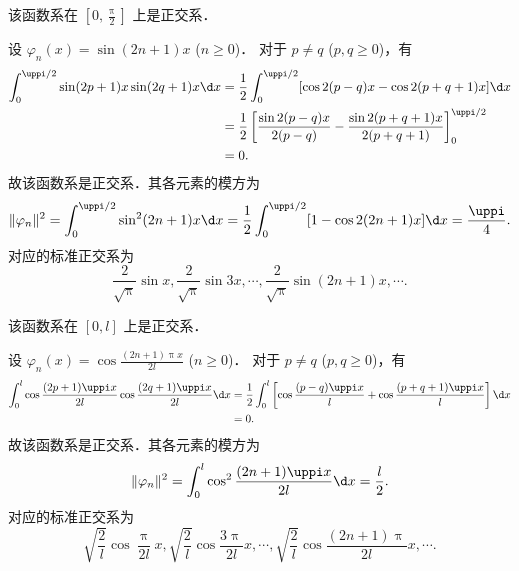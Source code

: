 \begin{myproof}
    该函数系在 $[0, \frac{\uppi}{2}]$ 上是正交系．

    设 $\varphi_n(x) = \sin(2n+1)x$ ($n \geqslant 0$)．
    对于 $p \neq q$ ($p, q \geqslant 0$)，有
    \begin{equation}\label{eq:orth-3-1}
        \begin{aligned}
            \int_{0}^{\uppi/2} \sin(2p+1)x \sin(2q+1)x \d x & = \frac{1}{2} \int_{0}^{\uppi/2} [\cos 2(p-q)x - \cos 2(p+q+1)x] \d x                                    \\
                                                            & = \frac{1}{2} \left[ \frac{\sin 2(p-q)x}{2(p-q)} - \frac{\sin 2(p+q+1)x}{2(p+q+1)} \right]_{0}^{\uppi/2} \\
                                                            & = 0.
        \end{aligned}
    \end{equation}
    故该函数系是正交系．其各元素的模方为
    \begin{equation}\label{eq:norm-3}
        \|\varphi_n\|^2 = \int_{0}^{\uppi/2} \sin^2(2n+1)x \d x = \frac{1}{2} \int_{0}^{\uppi/2} [1 - \cos 2(2n+1)x] \d x = \frac{\uppi}{4}.
    \end{equation}
    对应的标准正交系为
    \begin{equation}
        \boxed{\frac{2}{\sqrt{\uppi}}\sin x, \frac{2}{\sqrt{\uppi}}\sin 3x, \cdots, \frac{2}{\sqrt{\uppi}}\sin(2n+1)x, \cdots}.
    \end{equation}

    该函数系在 $[0, l]$ 上是正交系．

    设 $\varphi_n(x) = \cos \frac{(2n+1)\uppi x}{2l}$ ($n \geqslant 0$)．
    对于 $p \neq q$ ($p, q \geqslant 0$)，有
    \begin{equation}\label{eq:orth-4-1}
        \begin{aligned}
            \int_{0}^{l} \cos \frac{(2p+1)\uppi x}{2l} \cos \frac{(2q+1)\uppi x}{2l} \d x & = \frac{1}{2} \int_{0}^{l} \left[ \cos \frac{(p-q)\uppi x}{l} + \cos \frac{(p+q+1)\uppi x}{l} \right] \d x \\
                                                                                          & = 0.
        \end{aligned}
    \end{equation}
    故该函数系是正交系．其各元素的模方为
    \begin{equation}\label{eq:norm-4}
        \|\varphi_n\|^2 = \int_{0}^{l} \cos^2 \frac{(2n+1)\uppi x}{2l} \d x = \frac{l}{2}.
    \end{equation}
    对应的标准正交系为
    \begin{equation}
        \boxed{\sqrt{\frac{2}{l}}\cos \frac{\uppi}{2l}x, \sqrt{\frac{2}{l}}\cos \frac{3\uppi}{2l}x, \cdots, \sqrt{\frac{2}{l}}\cos \frac{(2n+1)\uppi}{2l}x, \cdots}.
    \end{equation}
\end{myproof}

